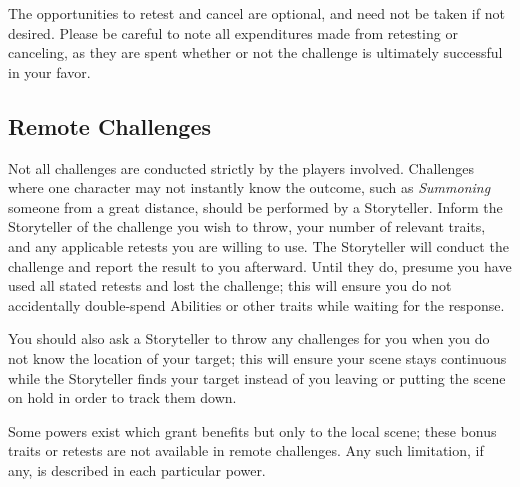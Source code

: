 The opportunities to retest and cancel are optional, and need not be taken if not desired.  Please be careful to 
note all expenditures made from retesting or canceling, as they are spent whether or not the challenge is 
ultimately successful in your favor.

\subsection{Remote Challenges}
Not all challenges are conducted strictly by the players involved.  Challenges where one character 
may not instantly know the outcome, such as \emph{Summoning} someone from a great distance, should 
be performed by a Storyteller.  Inform the Storyteller of the challenge you wish to throw, your 
number of relevant traits, and any applicable retests you are willing to use.  The Storyteller will 
conduct the challenge and report the result to you afterward.  Until they do, presume you have used 
all stated retests and lost the challenge; this will ensure you do not accidentally double-spend 
Abilities or other traits while waiting for the response.

You should also ask a Storyteller to throw any challenges for you when you do not know the location 
of your target; this will ensure your scene stays continuous while the Storyteller finds your target 
instead of you leaving or putting the scene on hold in order to track them down.

Some powers exist which grant benefits but only to the local scene; these bonus traits or retests 
are not available in remote challenges.  Any such limitation, if any, is described in each particular 
power.